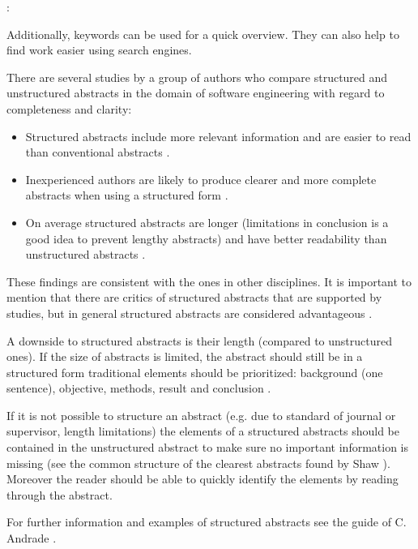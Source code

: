 : \cite{EBSE}

Additionally, keywords can be used for a quick overview. They can also help to find work easier using search engines.

There are several studies by a group of authors who compare structured and unstructured abstracts in the domain of software engineering with regard to completeness and clarity:
\begin{itemize}
\item Structured abstracts include more relevant information and are easier to read than conventional abstracts \cite{Budgen2007,Budgen2008}.
\item Inexperienced authors are likely to produce clearer and more complete abstracts when using a structured form \cite{Budgen2011} .
\item On average structured abstracts are longer (limitations in conclusion is a good idea to prevent lengthy abstracts) and have better readability than unstructured abstracts \cite{KBO2008}.
\end{itemize}
	
These findings are consistent with the ones in other disciplines. It is important to mention that there are critics of structured abstracts that are supported by studies, but in general structured abstracts are considered advantageous \cite{hartley2004,hartley2014}.	

A downside to structured abstracts is their length (compared to unstructured ones). If the size of abstracts is limited, the abstract should still be in a structured form traditional elements should be prioritized: background (one sentence), objective, methods, result and conclusion \cite{Jedlitschka2008}.

If it is not possible to structure an abstract (e.g. due to standard of journal or supervisor, length limitations) the elements of a structured abstracts should be contained in the unstructured abstract to make sure no important information is missing (see the common structure of the clearest abstracts found by Shaw \cite{shaw2003}). Moreover the reader should be able to quickly identify the elements by reading through the abstract.

For further information  and examples of structured abstracts see the guide of C. Andrade \cite{Andrade2011}.
